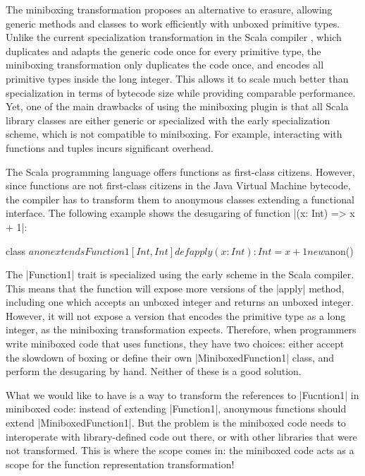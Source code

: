 The miniboxing transformation \cite{miniboxing} proposes an alternative to erasure, allowing generic methods and classes to work efficiently with unboxed primitive types. Unlike the current specialization transformation in the Scala compiler \cite{iuli-thesis}, which duplicates and adapts the generic code once for every primitive type, the miniboxing transformation only duplicates the code once, and encodes all primitive types inside the long integer. This allows it to scale much better than specialization \cite{miniboxing-linkedlist} in terms of bytecode size while providing comparable performance. Yet, one of the main drawbacks of using the miniboxing plugin is that all Scala library classes are either generic or specialized with the early specialization scheme, which is not compatible to miniboxing. For example, interacting with functions and tuples incurs significant overhead.

The Scala programming language offers functions as first-class citizens. However, since functions are not first-class citizens in the Java Virtual Machine bytecode, the compiler has to transform them to anonymous classes extending a functional interface. The following example shows the desugaring of function |(x: Int) => x + 1|:

\begin{lstlisting-nobreak}
class $anon extends Function1[Int, Int] {
  def apply(x: Int): Int = x + 1
}
new $anon()
\end{lstlisting-nobreak}

The |Function1| trait is specialized using the early scheme in the Scala compiler. This means that the function will expose more versions of the |apply| method, including one which accepts an unboxed integer and returns an unboxed integer. However, it will not expose a version that encodes the primitive type as a long integer, as the miniboxing transformation expects. Therefore, when programmers write miniboxed code that uses functions, they have two choices: either accept the slowdown of boxing or define their own |MiniboxedFunction1| class, and perform the desugaring by hand. Neither of these is a good solution.

What we would like to have is a way to transform the references to |Fucntion1| in miniboxed code: instead of extending |Function1|, anonymous functions should extend |MiniboxedFunction1|. But the problem is the miniboxed code needs to interoperate with library-defined code out there, or with other libraries that were not transformed. This is where the scope comes in: the miniboxed code acts as a scope for the function representation transformation!

